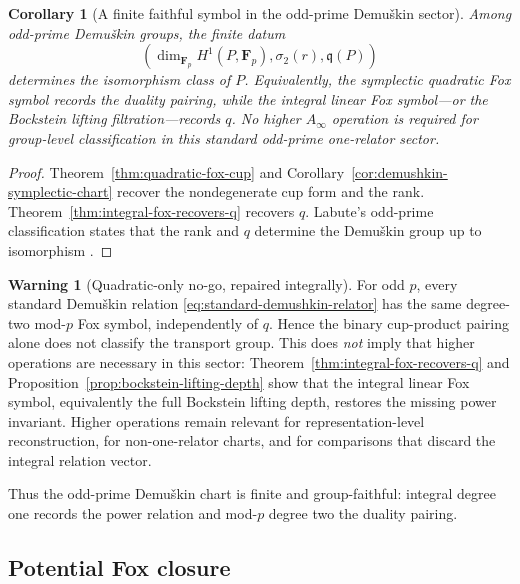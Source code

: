 \documentclass[11pt]{article}
\newtheorem{corollary}[theorem]{Corollary}
\theoremstyle{definition}
\newtheorem{warning}[theorem]{Warning}
\begin{document}
\begin{corollary}[A finite faithful symbol in the odd-prime Demu\v{s}kin sector]\label{cor:faithful-demushkin-symbol}
Among odd-prime Demu\v{s}kin groups, the finite datum
\begin{equation}\label{eq:faithful-demushkin-symbol}
\left(
\dim_{\mathbf F_p}H^1(P,\mathbf F_p),
\sigma_2(r),
\mathfrak q(P)
\right)
\end{equation}
determines the isomorphism class of $P$.  Equivalently, the symplectic quadratic Fox symbol records the duality pairing, while the integral linear Fox symbol---or the Bockstein lifting filtration---records $q$.  No higher $A_\infty$ operation is required for group-level classification in this standard odd-prime one-relator sector.
\end{corollary}

\begin{proof}
Theorem~\ref{thm:quadratic-fox-cup} and Corollary~\ref{cor:demushkin-symplectic-chart} recover the nondegenerate cup form and the rank.  Theorem~\ref{thm:integral-fox-recovers-q} recovers $q$.  Labute's odd-prime classification states that the rank and $q$ determine the Demu\v{s}kin group up to isomorphism \cite{LabuteClassification}.
\end{proof}

\begin{warning}[Quadratic-only no-go, repaired integrally]\label{warn:quadratic-symbol-q-nogo}
For odd $p$, every standard Demu\v{s}kin relation \eqref{eq:standard-demushkin-relator} has the same degree-two mod-$p$ Fox symbol, independently of $q$.  Hence the binary cup-product pairing alone does not classify the transport group.  This does \emph{not} imply that higher operations are necessary in this sector: Theorem~\ref{thm:integral-fox-recovers-q} and Proposition~\ref{prop:bockstein-lifting-depth} show that the integral linear Fox symbol, equivalently the full Bockstein lifting depth, restores the missing power invariant.  Higher operations remain relevant for representation-level reconstruction, for non-one-relator charts, and for comparisons that discard the integral relation vector.
\end{warning}

Thus the odd-prime Demu\v{s}kin chart is finite and group-faithful: integral degree one records the power relation and mod-$p$ degree two the duality pairing.

\subsection{Potential Fox closure}
\end{document}
